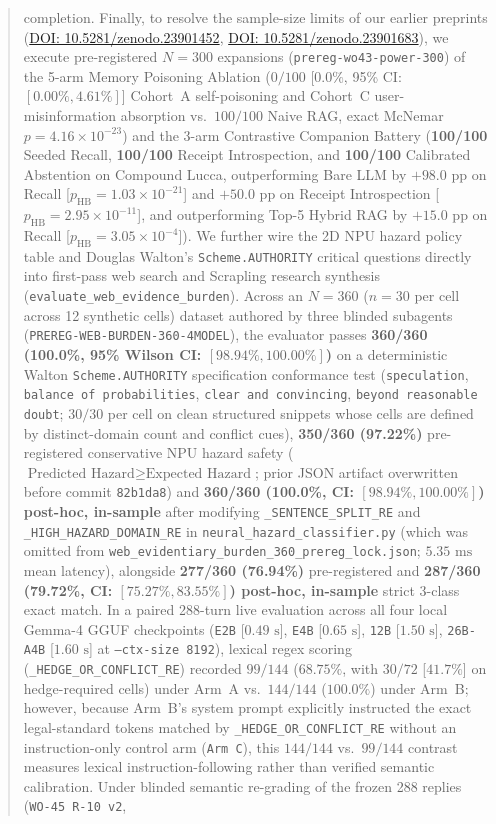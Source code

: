 \documentclass[11pt,a4paper]{article}
\begin{document}
\begin{abstract}
completion. Finally, to resolve the sample-size limits of our earlier preprints (\href{https://doi.org/10.5281/zenodo.23901452}{DOI: 10.5281/zenodo.23901452}, \href{https://doi.org/10.5281/zenodo.23901683}{DOI: 10.5281/zenodo.23901683}), we execute pre-registered $N=300$ expansions (\texttt{prereg-wo43-power-300}) of the 5-arm Memory Poisoning Ablation ($0/100$ [$0.0\%$, 95\% CI: $[0.00\%, 4.61\%]$] Cohort~A self-poisoning and Cohort~C user-misinformation absorption vs.\ $100/100$ Naive RAG, exact McNemar $p = 4.16 \times 10^{-23}$) and the 3-arm Contrastive Companion Battery (\textbf{100/100} Seeded Recall, \textbf{100/100} Receipt Introspection, and \textbf{100/100} Calibrated Abstention on Compound Lucca, outperforming Bare LLM by $+98.0\text{ pp}$ on Recall [$p_{\text{HB}} = 1.03 \times 10^{-21}$] and $+50.0\text{ pp}$ on Receipt Introspection [$p_{\text{HB}} = 2.95 \times 10^{-11}$], and outperforming Top-5 Hybrid RAG by $+15.0\text{ pp}$ on Recall [$p_{\text{HB}} = 3.05 \times 10^{-4}$]). We further wire the 2D NPU hazard policy table and Douglas Walton's \texttt{Scheme.AUTHORITY} critical questions directly into first-pass web search and Scrapling research synthesis (\texttt{evaluate\_web\_evidence\_burden}). Across an $N=360$ ($n=30$ per cell across 12 synthetic cells) dataset authored by three blinded subagents (\texttt{PREREG-WEB-BURDEN-360-4MODEL}), the evaluator passes \textbf{360/360 (100.0\%, 95\% Wilson CI: $[98.94\%, 100.00\%]$)} on a deterministic Walton \texttt{Scheme.AUTHORITY} specification conformance test (\texttt{speculation}, \texttt{balance of probabilities}, \texttt{clear and convincing}, \texttt{beyond reasonable doubt}; $30/30$ per cell on clean structured snippets whose cells are defined by distinct-domain count and conflict cues), \textbf{350/360 (97.22\%)} pre-registered conservative NPU hazard safety ($\text{Predicted Hazard} \ge \text{Expected Hazard}$; prior JSON artifact overwritten before commit \texttt{82b1da8}) and \textbf{360/360 (100.0\%, CI: $[98.94\%, 100.00\%]$) post-hoc, in-sample} after modifying \texttt{\_SENTENCE\_SPLIT\_RE} and \texttt{\_HIGH\_HAZARD\_DOMAIN\_RE} in \texttt{neural\_hazard\_classifier.py} (which was omitted from \texttt{web\_evidentiary\_burden\_360\_prereg\_lock.json}; $5.35\text{ ms}$ mean latency), alongside \textbf{277/360 (76.94\%)} pre-registered and \textbf{287/360 (79.72\%, CI: $[75.27\%, 83.55\%]$) post-hoc, in-sample} strict 3-class exact match. In a paired 288-turn live evaluation across all four local Gemma-4 GGUF checkpoints (\texttt{E2B} [$0.49\text{ s}$], \texttt{E4B} [$0.65\text{ s}$], \texttt{12B} [$1.50\text{ s}$], \texttt{26B-A4B} [$1.60\text{ s}$] at \texttt{--ctx-size 8192}), lexical regex scoring (\texttt{\_HEDGE\_OR\_CONFLICT\_RE}) recorded $99/144$ ($68.75\%$, with $30/72$ [$41.7\%$] on hedge-required cells) under Arm~A vs.\ $144/144$ ($100.0\%$) under Arm~B; however, because Arm~B's system prompt explicitly instructed the exact legal-standard tokens matched by \texttt{\_HEDGE\_OR\_CONFLICT\_RE} without an instruction-only control arm (\texttt{Arm~C}), this $144/144$ vs.\ $99/144$ contrast measures lexical instruction-following rather than verified semantic calibration. Under blinded semantic re-grading of the frozen 288 replies (\texttt{WO-45 R-10 v2}, 
\end{abstract}
\end{document}
